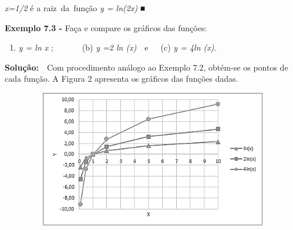 \documentclass[12pt]{article}
\begin{document}
\begin{adjustwidth}{0.39in}{0.0in}
\textit{x=1/2} é a raiz\ da\ função   \textit{y = ln(2x)} ■\par

\end{adjustwidth}


\vspace{\baselineskip}

\vspace{\baselineskip}
\begin{adjustwidth}{0.75in}{0.0in}
\textbf{Exemplo 7.3 -} Faça e compare os gráficos das funções: \par

\end{adjustwidth}


\vspace{\baselineskip}
\begin{enumerate}
	\item  \textit{y = ln x} ;\ \ \ \ \ \  \tab \ (b)  \textit{y =2 ln (x)}\ \  \tab e\ \ \  \tab (c) \textit{y = 4ln (x).}\ \ \ \  
\end{enumerate}\par


\vspace{\baselineskip}
\begin{adjustwidth}{0.69in}{0.0in}
\begin{justify}
\textbf{Solução:}\ \  Com procedimento análogo ao Exemplo 7.2, obtém-se os pontos de cada função. A Figura 2 apresenta os gráficos das funções dadas.
\end{justify}\par

\end{adjustwidth}




\begin{figure}[H]
	\begin{Center}
		\includegraphics[width=4.62in,height=2.34in]{./media/image7.png}
	\end{Center}
\end{figure}
\end{document}
